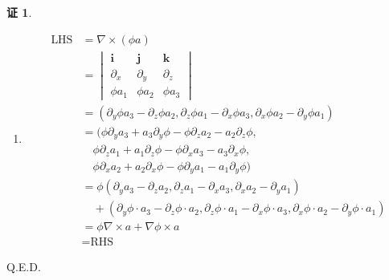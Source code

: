 \documentclass[a4paper,12pt]{article}
\theoremstyle{definition}
\newtheorem*{pf}{证}
\begin{document}
\begin{pf}
\begin{enumerate}
\begin{align*}
                   & =\text{RHS}
              \end{align*}
        \item \begin{align*}
                  \text{LHS}
                   & =\nabla\times(\phi a)                                                                                                                                     \\
                   & =\begin{vmatrix}
                          \boldsymbol{i} & \boldsymbol{j} & \boldsymbol{k} \\
                          \partial_x     & \partial_y     & \partial_z     \\
                          \phi a_1       & \phi a_2       & \phi a_3
                      \end{vmatrix}                                                                                                         \\
                   & =(\partial_y\phi a_3-\partial_z\phi a_2, \partial_z\phi a_1-\partial_x\phi a_3, \partial_x\phi a_2-\partial_y\phi a_1)                                    \\
                   & =(\phi\partial_ya_3+a_3\partial_y\phi-\phi\partial_za_2-a_2\partial_z\phi,                                                                                \\
                   & \quad\phi\partial_za_1+a_1\partial_z\phi-\phi\partial_xa_3-a_3\partial_x\phi,                                                                             \\
                   & \quad\phi\partial_xa_2+a_2\partial_x\phi-\phi\partial_ya_1-a_1\partial_y\phi)                                                                             \\
                   & =\phi(\partial_ya_3-\partial_za_2, \partial_za_1-\partial_xa_3, \partial_xa_2-\partial_ya_1)                                                              \\
                   & \quad+(\partial_y\phi\cdot a_3-\partial_z\phi\cdot a_2, \partial_z\phi\cdot a_1-\partial_x\phi\cdot a_3, \partial_x\phi\cdot a_2-\partial_y\phi\cdot a_1) \\
                   & =\phi\nabla\times a+\nabla\phi\times a                                                                                                                    \\
                   & =\text{RHS}
              \end{align*}
    \end{enumerate}

    Q.E.D.
\end{pf}
\end{document}
